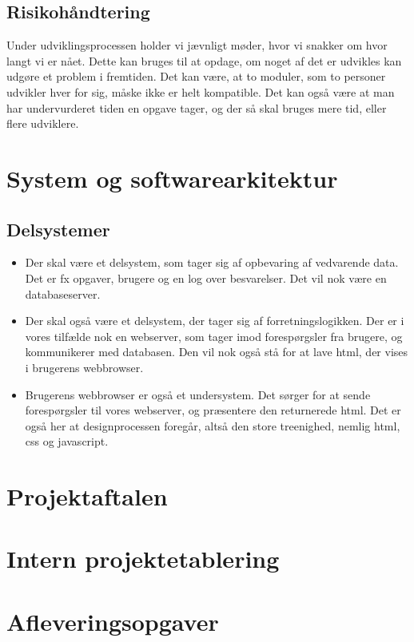 \documentclass[12pt]{article}
\begin{document}
\subsection{Risikohåndtering}
Under udviklingsprocessen holder vi jævnligt møder, hvor vi snakker om hvor langt vi er nået. Dette kan bruges til at opdage, om noget af det er udvikles kan udgøre et problem i fremtiden. Det kan være, at to moduler, som to personer udvikler hver for sig, måske ikke er helt kompatible. Det kan også være at man har undervurderet tiden en opgave tager, og der så skal bruges mere tid, eller flere udviklere.


\section{System og softwarearkitektur}
\subsection{Delsystemer}
\begin{itemize}
    \item Der skal være et delsystem, som tager sig af opbevaring af vedvarende data. Det er fx opgaver, brugere og en log over besvarelser. Det vil nok være en databaseserver.
    \item Der skal også være et delsystem, der tager sig af forretningslogikken. Der er i vores tilfælde nok en webserver, som tager imod forespørgsler fra brugere, og kommunikerer med databasen. Den vil nok også stå for at lave html, der vises i brugerens webbrowser.
    \item Brugerens webbrowser er også et undersystem. Det sørger for at sende forespørgsler til vores webserver, og præsentere den returnerede html. Det er også her at designprocessen foregår, altså den store treenighed, nemlig html, css og javascript.
\end{itemize}

\section{Projektaftalen}
\section{Intern projektetablering}

\section{Afleveringsopgaver}
\end{document}

